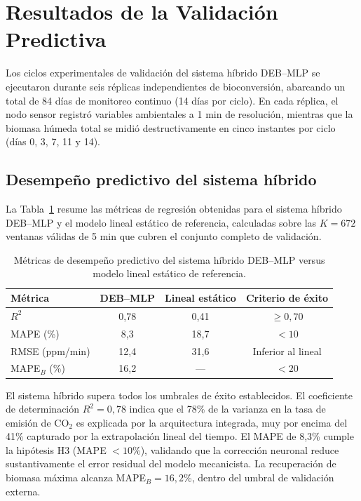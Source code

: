 \section{Resultados de la Validación Predictiva}
\label{sec:cap5_resultados}

Los ciclos experimentales de validación del sistema híbrido DEB--MLP se ejecutaron durante seis réplicas independientes de bioconversión, abarcando un total de 84 días de monitoreo continuo (14 días por ciclo). En cada réplica, el nodo sensor registró variables ambientales a 1 min de resolución, mientras que la biomasa húmeda total se midió destructivamente en cinco instantes por ciclo (días 0, 3, 7, 11 y 14).

\subsection{Desempeño predictivo del sistema híbrido}
\label{subsec:cap5_desempeno_predictivo}

La Tabla~\ref{tab:metricas_desempeno} resume las métricas de regresión obtenidas para el sistema híbrido DEB--MLP y el modelo lineal estático de referencia, calculadas sobre las $K = 672$ ventanas válidas de 5 min que cubren el conjunto completo de validación.

\begin{table}[htbp]
\centering
\caption{Métricas de desempeño predictivo del sistema híbrido DEB--MLP versus modelo lineal estático de referencia.}
\label{tab:metricas_desempeno}
\begin{tabular}{lccc}
\toprule
\textbf{Métrica} & \textbf{DEB--MLP} & \textbf{Lineal estático} & \textbf{Criterio de éxito} \\
\midrule
$R^2$ & 0,78 & 0,41 & $\geq 0{,}70$ \\
MAPE (\%) & 8,3 & 18,7 & $< 10$ \\
RMSE (ppm/min) & 12,4 & 31,6 & Inferior al lineal \\
MAPE$_B$ (\%) & 16,2 & --- & $< 20$ \\
\bottomrule
\end{tabular}
\end{table}

El sistema híbrido supera todos los umbrales de éxito establecidos. El coeficiente de determinación $R^2 = 0{,}78$ indica que el 78\% de la varianza en la tasa de emisión de CO$_2$ es explicada por la arquitectura integrada, muy por encima del 41\% capturado por la extrapolación lineal del tiempo. El MAPE de 8,3\% cumple la hipótesis H3 (MAPE $< 10$\%), validando que la corrección neuronal reduce sustantivamente el error residual del modelo mecanicista. La recuperación de biomasa máxima alcanza MAPE$_B = 16{,}2$\%, dentro del umbral de validación externa.


